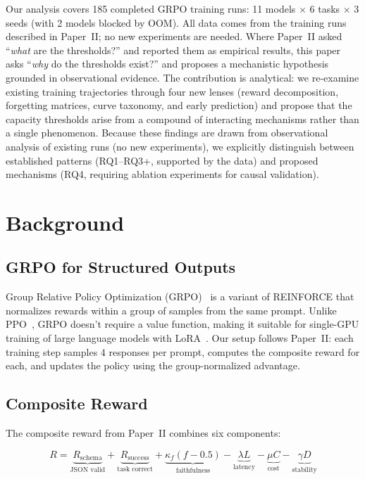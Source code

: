 \documentclass[11pt]{article}
\begin{document}
Our analysis covers 185 completed GRPO training runs: 11 models $\times$ 6 tasks $\times$ 3 seeds (with 2 models blocked by OOM).  All data comes from the training runs described in Paper~II; no new experiments are needed.  Where Paper~II asked ``\emph{what} are the thresholds?'' and reported them as empirical results, this paper asks ``\emph{why} do the thresholds exist?'' and proposes a mechanistic hypothesis grounded in observational evidence.  The contribution is analytical: we re-examine existing training trajectories through four new lenses (reward decomposition, forgetting matrices, curve taxonomy, and early prediction) and propose that the capacity thresholds arise from a compound of interacting mechanisms rather than a single phenomenon.  Because these findings are drawn from observational analysis of existing runs (no new experiments), we explicitly distinguish between established patterns (RQ1--RQ3+, supported by the data) and proposed mechanisms (RQ4, requiring ablation experiments for causal validation).

\section{Background}

\subsection{GRPO for Structured Outputs}

Group Relative Policy Optimization (GRPO)~\cite{grpo} is a variant of REINFORCE that normalizes rewards within a group of samples from the same prompt.  Unlike PPO~\cite{schulman2017ppo}, GRPO doesn't require a value function, making it suitable for single-GPU training of large language models with LoRA~\cite{hu2021lora}.  Our setup follows Paper~II: each training step samples 4 responses per prompt, computes the composite reward for each, and updates the policy using the group-normalized advantage.

\subsection{Composite Reward}

The composite reward from Paper~II combines six components:

\begin{equation}
R = \underbrace{R_{\text{schema}}}_{\text{JSON valid}} + \underbrace{R_{\text{success}}}_{\text{task correct}} + \underbrace{\kappa_f (f - 0.5)}_{\text{faithfulness}} - \underbrace{\lambda L}_{\text{latency}} - \underbrace{\mu C}_{\text{cost}} - \underbrace{\gamma D}_{\text{stability}}
\end{equation}
\end{document}
